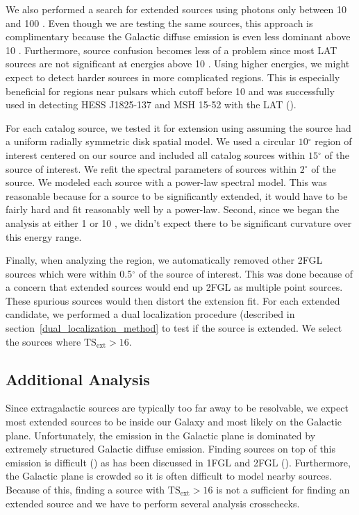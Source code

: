 \documentclass[12pt,preprint]{aastex}
\newcommand{\gev}{\text{GeV}\xspace}
\newcommand{\tsext}{{\ensuremath{\text{TS}_\text{ext}}}\xspace}
\renewcommand{\deg}{\ensuremath{^\circ}\xspace}
\newcommand{\pointlike}{\text{\em pointlike}\xspace}
\begin{document}
We also performed a search for extended sources using photons only between
10 \gev and 100 \gev. Even though we are testing the same sources, this
approach is complimentary because the Galactic diffuse emission is even
less dominant above 10 \gev. Furthermore, source confusion becomes less of
a problem since most LAT sources are not significant at energies above 10
\gev.  Using higher energies, we might expect to detect harder sources in
more complicated regions. This is especially beneficial
for regions near pulsars which cutoff before 10 \gev
and was successfully used in detecting HESS J1825-137
and MSH 15-52 with the LAT (\cite{msh1552,fermi_hess_j1825}).

For each catalog source, we tested it for extension using \pointlike
assuming the source had a uniform radially symmetric disk spatial model.
We used a circular $10\deg$ region of interest centered on our source and
included all catalog sources within $15\deg$ of the source of interest.
We refit the spectral parameters of sources within $2\deg$ of the source.
We modeled each source with a power-law spectral model. This was reasonable because for a source to be significantly
extended, it would have to be fairly hard and fit reasonably well by
a power-law. Second, since we began the analysis at either 1 \gev or
10 \gev, we didn't expect there to be significant curvature over this
energy range.

Finally, when analyzing the region, we automatically removed other
2FGL sources which were within 0.5\deg of the source of interest. This was done because of
a concern that extended sources would end up 2FGL as
multiple point sources. These spurious sources would then
distort the extension fit.
For each extended candidate, we performed a dual localization procedure
(described in section~\ref{dual_localization_method} to test if the
source is extended. We select the sources where $\tsext>16$.

\subsection{Additional Analysis}

Since extragalactic sources are typically too far away to be resolvable,
we expect most extended sources to be inside our Galaxy and most
likely on the Galactic plane.  Unfortunately, the \gev emission
in the Galactic plane is dominated by extremely structured Galactic
diffuse emission.  Finding sources on top of this emission is difficult
(\cite{first_diffuse_paper}) as has been discussed in 1FGL and 2FGL
(\cite{first_cat,second_cat}).  Furthermore, the Galactic plane is crowded
so it is often difficult to model nearby sources.  Because of this,
finding a source with $\tsext>16$ is not a sufficient for finding
an extended source and we have to perform several analysis crosschecks.
\end{document}
